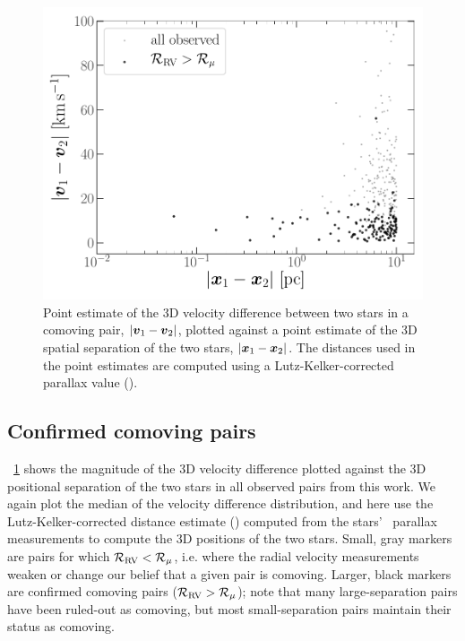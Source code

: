 \documentclass[modern, letterpaper]{aastex61}
\newcommand{\tgas}{\acronym{TGAS}}
\newcommand{\llrold}{\ensuremath{\mathcal{R}_\mu}}
\newcommand{\llrnew}{\ensuremath{\mathcal{R}_{\rm RV}}}
\begin{document}
\begin{figure}[htb]
  \begin{center}
    \includegraphics[width=0.9\linewidth]{dx-dv.pdf}
  \end{center}
  \caption{%
    Point estimate of the 3D velocity difference between two stars in a comoving
    pair, $|\boldsymbol{v}_1 - \boldsymbol{v}_2|$, plotted against a point estimate of the 3D
    spatial separation of the two stars, $|\boldsymbol{x}_1 - \boldsymbol{x}_2|$.
    The distances used in the point estimates are computed using a
    Lutz-Kelker-corrected parallax value (\citealt{Lutz:1973}).
    \label{fig:dx-dv}}
\end{figure}

\subsection{Confirmed comoving pairs}\label{sec:genuine}

\figurename~\ref{fig:dx-dv} shows the magnitude of the 3D velocity difference
plotted against the 3D positional separation of the two stars in all observed
pairs from this work.
We again plot the median of the velocity difference distribution, and here use
the Lutz-Kelker-corrected distance estimate (\citealt{Lutz:1973}) computed from
the stars' \tgas\ parallax measurements to compute the 3D positions of the two
stars.
Small, gray markers are pairs for which $\llrnew < \llrold$, i.e. where the
radial velocity measurements weaken or change our belief that a given pair is
comoving.
Larger, black markers are confirmed comoving pairs ($\llrnew > \llrold$); note
that many large-separation pairs have been ruled-out as comoving, but
most small-separation pairs maintain their status as comoving.
\end{document}
